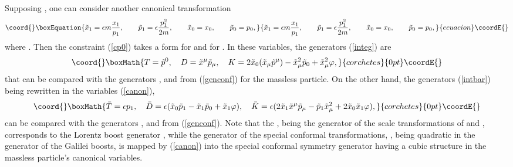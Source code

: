 \documentclass[a4paper,12pt]{article}
\begin{document}
Supposing \coordHE{},
one can consider another canonical transformation
\begin{equation}\coord{}\boxEquation{
\tilde x_1=\epsilon m\frac{x_1}{p_1}, \qquad
\tilde p_1=\epsilon \frac{p_1^2}{2m},\qquad
\tilde x_0=x_0,\qquad
\tilde p_0=p_0,
\label{canon}
}{
\tilde x_1=\epsilon m\frac{x_1}{p_1}, \qquad
\tilde p_1=\epsilon \frac{p_1^2}{2m},\qquad
\tilde x_0=x_0,\qquad
\tilde p_0=p_0,
}{ecuacion}\coordE{}\end{equation}
where
\coordHE{}.
Then the constraint (\ref{cp0}) takes a form
\coordHE{} for \coordHE{}
and \coordHE{} for \coordHE{}.
In these variables,
the \coordHE{} generators
(\ref{integ}) are
\[\coord{}\boxMath{
T=\tilde p{}^0,\quad
D=\tilde x^\mu \tilde p_\mu,
\quad
K=2\tilde x_0 (\tilde x_\mu \tilde p^\mu)
-\tilde x{}^2_\mu\tilde p_0 +\tilde x{}^2_\mu\varphi,
}{corchetes}{0pt}\coordE{}\]
that can be compared with the
generators
\coordHE{},
\coordHE{} and \coordHE{} from
(\ref{genconf})
for the massless particle.
On the other hand,
the generators (\ref{intbar})
being rewritten in the variables
(\ref{canon}),
\[\coord{}\boxMath{
\bar T=\epsilon p_1,\quad
\bar D= \epsilon(\tilde x_0\tilde p_1-\tilde x_1\tilde p_0
+\tilde x_1\varphi),
\quad
\bar K=\epsilon(2\tilde x_1\tilde x{}^\mu\tilde p_\mu
-\tilde p_1\tilde x_\mu^2+2\tilde x_0\tilde x_1\varphi),
}{corchetes}{0pt}\coordE{}\]
can be compared with the generators
\coordHE{}, \coordHE{} and \coordHE{}
from (\ref{genconf}).
Note that the \coordHE{}, being the
generator of the scale
transformations of \coordHE{} and \coordHE{},
corresponds
to the Lorentz boost generator \coordHE{},
while the generator of the
special conformal transformations,
\coordHE{}, being
quadratic in the generator of the Galilei boosts,
is mapped by (\ref{canon})
into the special conformal symmetry generator
\coordHE{}  having a cubic structure in
the massless particle's canonical variables.
\end{document}
